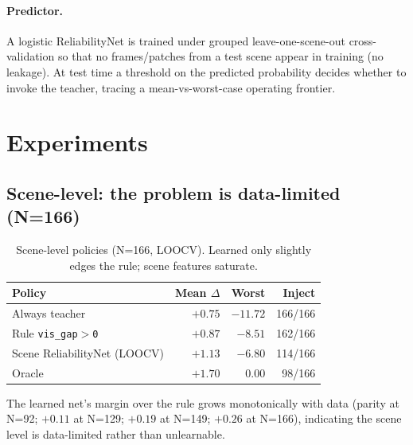 \documentclass[10pt,twocolumn,letterpaper]{article}
\begin{document}
\paragraph{Predictor.} A logistic ReliabilityNet is trained under grouped
leave-one-scene-out cross-validation so that no frames/patches from a test scene
appear in training (no leakage). At test time a threshold on the predicted
probability decides whether to invoke the teacher, tracing a mean-vs-worst-case
operating frontier.

\section{Experiments}
\label{sec:exp}

\subsection{Scene-level: the problem is data-limited (N=166)}
\begin{table}[t]
\centering\small
\caption{Scene-level policies (N=166, LOOCV). Learned only slightly edges the
rule; scene features saturate.}
\begin{tabular}{lrrr}
\toprule
Policy & Mean $\Delta$ & Worst & Inject \\
\midrule
Always teacher & $+0.75$ & $-11.72$ & 166/166 \\
Rule \texttt{vis\_gap$>$0} & $+0.87$ & $-8.51$ & 162/166 \\
Scene ReliabilityNet (LOOCV) & $+1.13$ & $-6.80$ & 114/166 \\
Oracle & $\mathbf{+1.70}$ & $0.00$ & 98/166 \\
\bottomrule
\end{tabular}
\end{table}
The learned net's margin over the rule grows monotonically with data (parity at
N=92; $+0.11$ at N=129; $+0.19$ at N=149; $+0.26$ at N=166), indicating the
scene level is data-limited rather than unlearnable.
\end{document}
